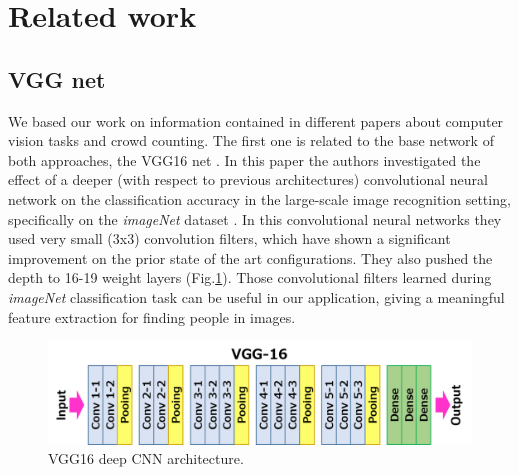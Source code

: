 \documentclass[10pt,twocolumn,letterpaper]{article}
\begin{document}
\section{Related work}

\subsection{VGG net}
We based our work on information contained in different papers about computer vision tasks and crowd counting. The first one is related to the base network of both approaches, the VGG16 net \cite{simonyan2014very}. In this paper the authors investigated the effect of a deeper (with respect to previous architectures) convolutional neural network on the classification accuracy in the
large-scale image recognition setting, specifically on the \textit{imageNet} dataset \cite{deng2009imagenet}. In this convolutional neural networks they used very small (3x3) convolution filters, which have shown a significant improvement on the prior state of the art configurations. They also pushed the depth to 16-19 weight layers (Fig.\ref{fig:vgg16}). Those convolutional filters learned during \textit{imageNet} classification task can be useful in our application, giving a meaningful feature extraction for finding people in images.

\begin{figure}[h!]
  \includegraphics[width=\linewidth]{pics/vgg16.png}
  \caption{VGG16 deep CNN architecture.}
  \label{fig:vgg16}
\end{figure}
\end{document}

